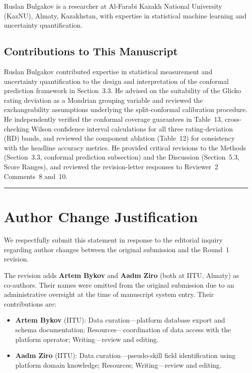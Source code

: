 \documentclass[11pt]{article}
\begin{document}
Ruslan Bulgakov is a researcher at Al-Farabi Kazakh National University (KazNU),
Almaty, Kazakhstan, with expertise in statistical machine learning and
uncertainty quantification.

\subsection*{Contributions to This Manuscript}

Ruslan Bulgakov contributed expertise in statistical measurement and uncertainty
quantification to the design and interpretation of the conformal prediction framework
in Section~3.3.
He advised on the suitability of the Glicko rating deviation as a Mondrian grouping
variable and reviewed the exchangeability assumptions underlying the split-conformal
calibration procedure.
He independently verified the conformal coverage guarantees in Table~13,
cross-checking Wilson confidence interval calculations for all three rating-deviation (RD) bands,
and reviewed the component ablation (Table~12) for consistency with the headline
accuracy metrics.
He provided critical revisions to the Methods (Section~3.3, conformal prediction
subsection) and the Discussion (Section~5.3, Score Ranges), and reviewed the
revision-letter responses to Reviewer~2 Comments~8 and~10.

\bigskip\hrule\bigskip

\section*{Author Change Justification}

We respectfully submit this statement in response to the editorial inquiry regarding
author changes between the original submission and the Round~1 revision.

The revision adds \textbf{Artem Bykov} and \textbf{Aadm Ziro} (both at IITU, Almaty)
as co-authors.
Their names were omitted from the original submission due to an administrative
oversight at the time of manuscript system entry.
Their contributions are:

\begin{itemize}
  \item \textbf{Artem Bykov} (IITU): Data curation---platform database export and
    schema documentation; Resources---coordination of data access with the platform
    operator; Writing---review and editing.
  \item \textbf{Aadm Ziro} (IITU): Data curation---pseudo-skill field identification
    using platform domain knowledge; Resources; Writing---review and editing.
\end{itemize}
\end{document}

